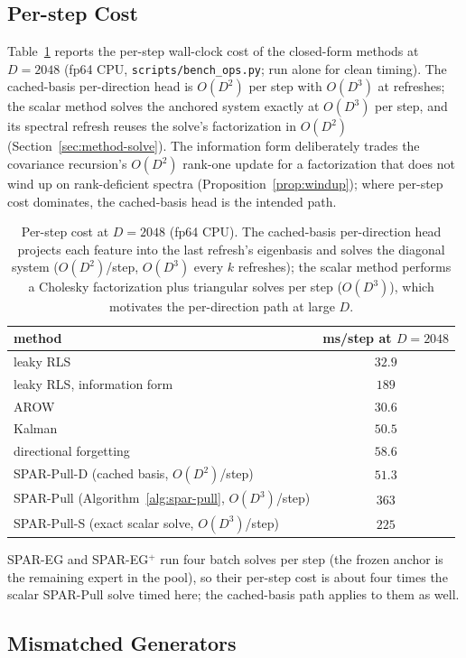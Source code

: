 \documentclass[11pt]{article}
\begin{document}
\subsection{Per-step Cost}
Table~\ref{tab:app-ops} reports the per-step wall-clock cost of the closed-form methods at $D = 2048$ (fp64 CPU, \texttt{scripts/bench\_ops.py}; run alone for clean timing).
The cached-basis per-direction head is $O(D^2)$ per step with $O(D^3)$ at refreshes; the scalar method solves the anchored system exactly at $O(D^3)$ per step, and its spectral refresh reuses the solve's factorization in $O(D^2)$ (Section~\ref{sec:method-solve}).
The information form deliberately trades the covariance recursion's $O(D^2)$ rank-one update for a factorization that does not wind up on rank-deficient spectra (Proposition~\ref{prop:windup}); where per-step cost dominates, the cached-basis head is the intended path.

\begin{table}[h]
\centering
\footnotesize
\caption{Per-step cost at $D = 2048$ (fp64 CPU).
The cached-basis per-direction head projects each feature into the last refresh's eigenbasis and solves the diagonal system ($O(D^2)$/step, $O(D^3)$ every $k$ refreshes); the scalar method performs a Cholesky factorization plus triangular solves per step ($O(D^3)$), which motivates the per-direction path at large $D$.}
\label{tab:app-ops}
\begin{tabular}{lc}
\toprule
method & ms/step at $D = 2048$ \\
\midrule
leaky RLS & $32.9$ \\
leaky RLS, information form & $189$ \\
AROW & $30.6$ \\
Kalman & $50.5$ \\
directional forgetting & $58.6$ \\
SPAR-Pull-D (cached basis, $O(D^2)$/step) & $51.3$ \\
SPAR-Pull (Algorithm~\ref{alg:spar-pull}, $O(D^3)$/step) & $363$ \\
SPAR-Pull-S (exact scalar solve, $O(D^3)$/step) & $225$ \\
\bottomrule
\end{tabular}
\end{table}
SPAR-EG and SPAR-EG$^+$ run four batch solves per step (the frozen anchor is the remaining expert in the pool), so their per-step cost is about four times the scalar SPAR-Pull solve timed here; the cached-basis path applies to them as well.

\subsection{Mismatched Generators}
\end{document}
